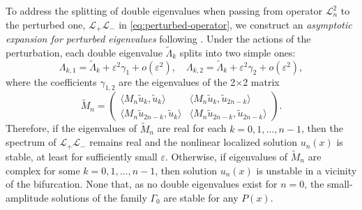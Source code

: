 To address the splitting of double eigenvalues when passing from operator $\mathcal{L}_n^2$ to the perturbed one, $\mathcal{L}_+ \mathcal{L}_-$ in \eqref{eq:perturbed-operator}, we construct an {\it asymptotic expansion for perturbed eigenvalues} following \cite{ZezyulinAlfimovKonotopPerecGarcia2008}.
Under the actions of the perturbation, each double eigenvalue $\widetilde{\Lambda}_k$ splits into two simple ones:
\begin{equation}
	\Lambda_{k, 1} = \widetilde{\Lambda}_k + \varepsilon^2 \gamma_1 + o(\varepsilon^2), \quad \Lambda_{k, 2} = \widetilde{\Lambda}_k + \varepsilon^2 \gamma_2 + o(\varepsilon^2),
\end{equation}
where the coefficients $\gamma_{1,2}$ are the eigenvalues of the 2$\times$2 matrix
\begin{equation}
	\widetilde{M}_n =
	\begin{pmatrix}
		\langle M_n \tilde{u}_k, \tilde{u}_k \rangle & \langle M_n \tilde{u}_k, \tilde{u}_{2n - k} \rangle \\
		\langle M_n \tilde{u}_{2n - k}, \tilde{u}_k \rangle & \langle M_n \tilde{u}_{2n - k}, \tilde{u}_{2n - k} \rangle
	\end{pmatrix}.
\end{equation}
Therefore, if the eigenvalues of $\widetilde{M}_n$ are real for each $k = 0, 1, \dots, n - 1$, then the spectrum of $\mathcal{L}_+ \mathcal{L}_-$ remains real and the nonlinear localized solution $u_n(x)$ is stable, at least for sufficiently small $\varepsilon$.
Otherwise, if eigenvalues of $\widetilde{M}_n$ are complex for some $k = 0, 1, \dots, n - 1$, then solution $u_n(x)$ is unstable in a vicinity of the bifurcation.
None that, as no double eigenvalues exist for $n = 0$, the small-amplitude solutions of the family $\Gamma_0$ are stable for any $P(x)$.

